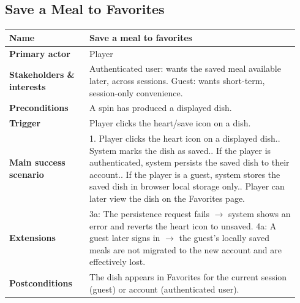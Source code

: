 \documentclass[sigconf]{acmart}
\begin{document}
\subsection*{Save a Meal to Favorites}
{\footnotesize
\begin{supertabular}{@{}p{0.26\linewidth}p{0.68\linewidth}@{}}
\textbf{Name} & Save a meal to favorites \\
\hline
\textbf{Primary actor} & Player \\
\hline
\textbf{Stakeholders \& interests} & Authenticated user: wants the saved meal available later, across sessions. Guest: wants short-term, session-only convenience. \\
\hline
\textbf{Preconditions} & A spin has produced a displayed dish. \\
\hline
\textbf{Trigger} & Player clicks the heart/save icon on a dish. \\
\hline
\textbf{Main success scenario} & 1. Player clicks the heart icon on a displayed dish.. System marks the dish as saved.. If the player is authenticated, system persists the saved dish to their account.. If the player is a guest, system stores the saved dish in browser local storage only.. Player can later view the dish on the Favorites page. \\
\hline
\textbf{Extensions} & 3a: The persistence request fails $\rightarrow$ system shows an error and reverts the heart icon to unsaved.\newline
4a: A guest later signs in $\rightarrow$ the guest's locally saved meals are not migrated to the new account and are effectively lost. \\
\hline
\textbf{Postconditions} & The dish appears in Favorites for the current session (guest) or account (authenticated user). \\
\end{supertabular}
}
\end{document}
